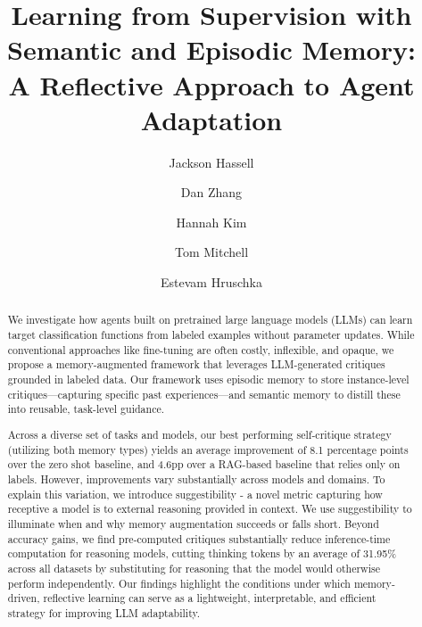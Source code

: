 \documentclass[sigconf]{acmart}
\begin{document}
\title{Learning from Supervision with Semantic and Episodic Memory: \\A Reflective Approach to Agent Adaptation}

\author{Jackson Hassell}

\author{Dan Zhang}

\author{Hannah Kim}

\author{Tom Mitchell}

\author{Estevam Hruschka}



\begin{abstract}
We investigate how agents built on pretrained large language models (LLMs) can learn target classification functions from labeled examples without parameter updates. While conventional approaches like fine-tuning are often costly, inflexible, and opaque, we propose a memory-augmented framework that leverages LLM-generated critiques grounded in labeled data. Our framework uses episodic memory to store instance-level critiques—capturing specific past experiences—and semantic memory to distill these into reusable, task-level guidance.

Across a diverse set of tasks and models, our best performing self-critique strategy (utilizing both memory types) yields an average improvement of 8.1 percentage points over the zero shot baseline, and 4.6pp over a RAG-based baseline that relies only on labels. However, improvements vary substantially across models and domains. To explain this variation, we introduce suggestibility - a novel metric capturing how receptive a model is to external reasoning provided in context. We use suggestibility to illuminate when and why memory augmentation succeeds or falls short. Beyond accuracy gains, we find pre-computed critiques  substantially reduce inference-time computation for reasoning models, cutting thinking tokens by an average of 31.95\% across all datasets by substituting for reasoning that the model would otherwise perform independently. Our findings highlight the conditions under which memory-driven, reflective learning can serve as a lightweight, interpretable, and efficient strategy for improving LLM adaptability.

\end{abstract}
\end{document}
